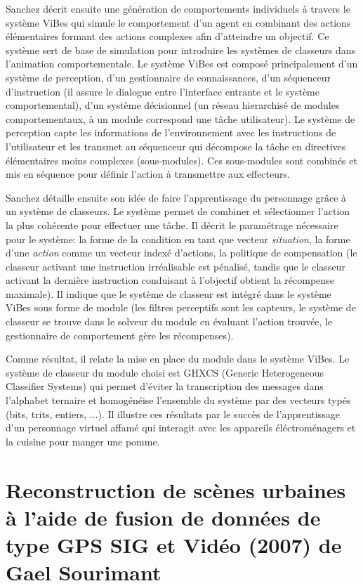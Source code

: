 \documentclass[11pt]{article}
\begin{document}
Sanchez décrit ensuite une génération de comportements individuels à travers le système ViBes qui simule le comportement d'un agent en combinant des actions élémentaires formant des actions complexes afin d'atteindre un objectif. Ce système sert de base de simulation pour introduire les systèmes de classeurs dans l'animation comportementale. Le système ViBes est composé principalement d'un système de perception, d'un gestionnaire de connaissances, d'un séquenceur d'instruction (il assure le dialogue entre l'interface entrante et le système comportemental), d'un système décisionnel (un réseau hierarchisé de modules comportementaux, à un module correspond une tâche utilisateur). Le système de perception capte les informations de l'environnement avec les instructions de l'utilisateur et les transmet au séquenceur qui décompose la tâche en directives élémentaires moins complexes (sous-modules). Ces sous-modules sont combinés et mis en séquence pour définir l'action à transmettre aux effecteurs.

Sanchez détaille ensuite son idée de faire l'apprentissage du personnage grâce à un système de classeurs. Le système permet de combiner et sélectionner l'action la plus cohérente pour effectuer une tâche. Il décrit le paramétrage nécessaire pour le système: la forme de la condition en tant que vecteur \textit{situation}, la forme d'une \textit{action} comme un vecteur indexé d'actions, la politique de compensation (le classeur activant une instruction irréalisable est pénalisé, tandis que le classeur activant la dernière instruction conduisant à l'objectif obtient la récompense maximale). Il indique que le système de classeur est intégré dans le système ViBes sous forme de module (les filtres perceptifs sont les capteurs, le système de classeur se trouve dans le solveur du module en évaluant l'action trouvée, le gestionnaire de comportement gère les récompenses).

Comme résultat, il relate la mise en place du module dans le système ViBes. Le système de classeur du module choisi est GHXCS (Generic Heterogeneous Classifier Systems) qui permet d'éviter la transcription des messages dans l'alphabet ternaire et homogénéise l'ensemble du système par des vecteurs typés (bits, trits, entiers, ...). Il illustre ces résultats par le succès de l'apprentissage d'un personnage virtuel affamé qui interagit avec les appareils éléctroménagers et la cuisine pour manger une pomme. 


\section{Reconstruction de scènes urbaines à l’aide de fusion de données de type GPS  SIG et Vidéo (2007) de Gael Sourimant}
\end{document}
